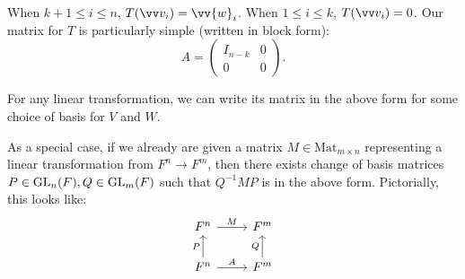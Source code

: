 When $k+1 \leq i \leq n$, $T(\vvv_i) = \vv{w}_i$. When $1 \leq i \leq k$, $T(\vvv_i) = 0$.
Our matrix for $T$ is particularly simple (written in block form):
\[A=
\begin{pmatrix}
    I_{n-k} & 0 \\
    0 & 0
\end{pmatrix}.\]
\begin{corollary}
    For any linear transformation, we can write its matrix in the above form for some choice of basis for $V$ and $W$.
\end{corollary}
\begin{corollary}
As a special case, if we already are given a matrix $M \in \text{Mat}_{m\times n}$ representing a linear transformation from $F^n \rightarrow F^m$, then there exists change of basis matrices $P \in \operatorname{GL}_n(F), Q \in \operatorname{GL}_m(F)$ such that $Q^{-1} M P$ is in the above form.
Pictorially, this looks like: 
\[
\begin{tikzcd}
F^n \arrow[r, "M"] & F^m \\
F^n \arrow[u, "P"]\arrow[r, "A"] & F^m \arrow[u, "Q"]
\end{tikzcd}
\]
\end{corollary}


\newpage